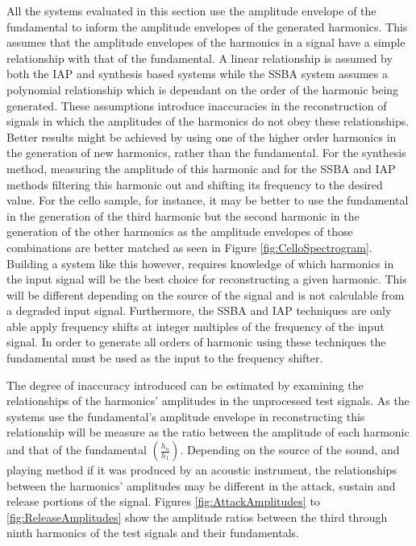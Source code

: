 		All the systems evaluated in this section use the amplitude envelope of the fundamental to inform the
		amplitude envelopes of the generated harmonics. This assumes that the amplitude envelopes of the harmonics
		in a signal have a simple relationship with that of the fundamental. A linear relationship is assumed by
		both the IAP and synthesis based systems while the SSBA system assumes a polynomial relationship which is
		dependant on the order of the harmonic being generated. These assumptions introduce inaccuracies in the
		reconstruction of signals in which the amplitudes of the harmonics do not obey these relationships. Better
		results might be achieved by using one of the higher order harmonics in the generation of new harmonics,
		rather than the fundamental. For the synthesis method, measuring the amplitude of this harmonic and for the
		SSBA and IAP methods filtering this harmonic out and shifting its frequency to the desired value. For the
		cello sample, for instance, it may be better to use the fundamental in the generation of the third harmonic
		but the second harmonic in the generation of the other harmonics as the amplitude envelopes of those
		combinations are better matched as seen in Figure \ref{fig:CelloSpectrogram}. Building a system like this
		however, requires knowledge of which harmonics in the input signal will be the best choice for
		reconstructing a given harmonic. This will be different depending on the source of the signal and is not
		calculable from a degraded input signal. Furthermore, the SSBA and IAP techniques are only able apply
		frequency shifts at integer multiples of the frequency of the input signal. In order to generate all orders
		of harmonic using these techniques the fundamental must be used as the input to the frequency shifter.
		
		The degree of inaccuracy introduced can be estimated by examining the relationships of the harmonics'
		amplitudes in the unprocessed test signals. As the systems use the fundamental's amplitude envelope in
		reconstructing this relationship will be measure as the ratio between the amplitude of each harmonic and
		that of the fundamental $\left(\frac{h_{n}}{h_{1}}\right)$. Depending on the source of the sound, and
		playing method if it was produced by an acoustic instrument, the relationships between the harmonics'
		amplitudes may be different in the attack, sustain and release portions of the signal. Figures
		\ref{fig:AttackAmplitudes} to \ref{fig:ReleaseAmplitudes} show the amplitude ratios between the third
		through ninth harmonics of the test signals and their fundamentals.

